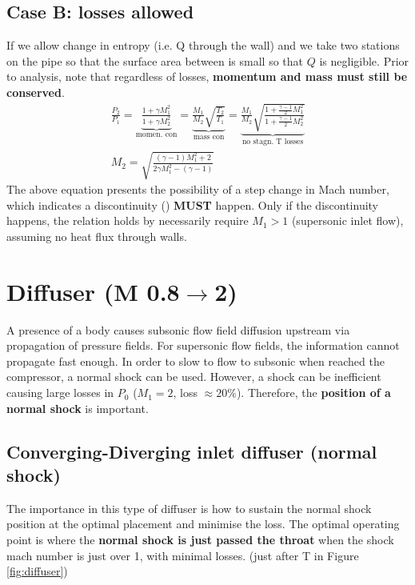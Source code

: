 \documentclass[a4paper,10pt]{article}
\begin{document}
\subsection{Case B: losses allowed}
If we allow change in entropy (i.e. Q through the wall) and we take two stations on the pipe so that the surface area between is small so that $Q$ is negligible. Prior to analysis, note that regardless of losses, \textbf{momentum and mass must still be conserved}.
\begin{gather*}
    \frac{P_2}{P_1} = \underbrace{\frac{1+\gamma M_1^2}{1+\gamma M_2^2}}_\text{momen. con} = \underbrace{\frac{M_1}{M_2}\sqrt{\frac{T_2}{T_1}}}_\text{mass con} = \underbrace{\frac{M_1}{M_2}\sqrt{\frac{1+\frac{\gamma-1}{2}M_1^2}{1+\frac{\gamma-1}{2}M_2^2}}}_\text{no stagn. T losses}\\
    \boxed{M_2=\sqrt{\frac{(\gamma-1)M_1^2+2}{2\gamma M_1^2-(\gamma-1)}}}
\end{gather*}
The above equation presents the possibility of a step change in Mach number, which indicates a discontinuity () \textbf{MUST} happen. Only if the discontinuity happens, the relation holds by necessarily require $M_1>1$ (supersonic inlet flow), assuming no heat flux through walls. 



\section{Diffuser (M 0.8$\rightarrow$2)}
A presence of a body causes subsonic flow field diffusion upstream via propagation of pressure fields. For supersonic flow fields, the information cannot propagate fast enough. In order to slow to flow to subsonic when reached the compressor, a normal shock can be used. However, a shock can be inefficient causing large losses in $P_0$ ($M_1=2$, loss $\approx20\%$). Therefore, the \textbf{position of a normal shock} is important. 

\subsection{Converging-Diverging inlet diffuser (normal shock)}
The importance in this type of diffuser is how to sustain the normal shock position at the optimal placement and minimise the loss. The optimal operating point is where the \textbf{normal shock is just passed the throat} when the shock mach number is just over 1, with minimal losses. (just after T in Figure \ref{fig:diffuser})
\end{document}
